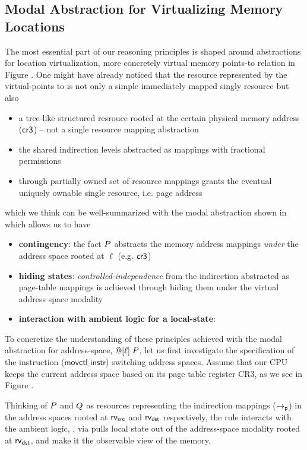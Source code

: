 \subsection{Modal Abstraction for Virtualizing Memory Locations}
\label{sec:modallocationvirtualization}

The most essential part of our reasoning principles is shaped around abstractions for location virtualization, more concretely virtual memory points-to relation in Figure . One might have already noticed that the resource represented by the virtual-points to is not only a simple immediately mapped singly resource but also
\begin{itemize}
\item a tree-like structured resrouce rooted at the certain physical memory address ($\mathsf{cr3}$) -- not a single resource mapping abstraction 
\item the shared indirection levels abstracted as mappings with fractional permissions
\item through partially owned set of resource mappings grants the eventual uniquely ownable single resource, i.e. page address 
\end{itemize}
which we think can be well-summarized with the modal abstraction shown in  which allows us to have
\begin{itemize}
  \item \textbf{contingency}: the fact $P$ abstracts the memory address mappings \textit{under} the address space rooted at $\ell$ (e.g. $\mathsf{cr3}$)
  \item \textbf{hiding states}: \textit{controlled-independence} from the indirection abstracted as page-table mappings is achieved through hiding them under the virtual address space modality
  \item \textbf{interaction with ambient logic for a local-state}: 
\end{itemize}

To concretize the understanding of these principles achieved with the modal abstraction for address-space, $@[\ell]\; P$, let us first investigate the specification of the instruction ($\textsf{movctl\_instr}$) switching address spaces. Assume that our CPU keeps the current address space based on its page table register CR3, as we see in Figure .

Thinking of $P$ and $Q$ as resources representing the indirection mappings ($\mapsto_{\mathsf{p}}$) in the address spaces rooted at $\mathsf{rv}_{\textsf{src}}$ and $\mathsf{rv}_{\textsf{dst}}$ respectively, the rule interacts with the ambient logic, \SL, via pulls local state out of the address-space modality rooted at $\mathsf{rv}_{\textsf{dst}}$, and make it the observable view of the memory.


